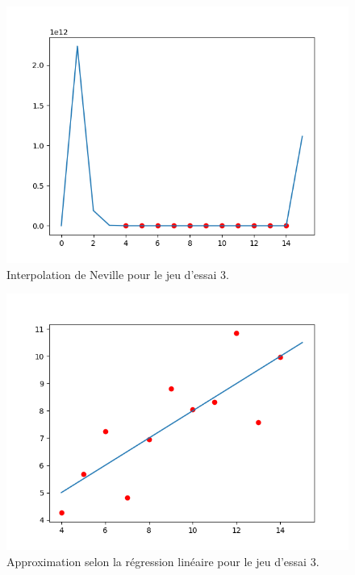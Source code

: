 \documentclass[12pt,french,titlepage]{article}
\begin{document}
		\begin{figure}[H]
		\includegraphics[width=\textwidth]{"32.png"}
		\caption{Interpolation de Neville pour le jeu d'essai 3.}
		\end{figure}
		
		\begin{figure}[H]
		\includegraphics[width=\textwidth]{"33.png"}
		\caption{Approximation selon la régression linéaire pour le jeu d'essai 3.}
		\end{figure}
	
\end{document}
